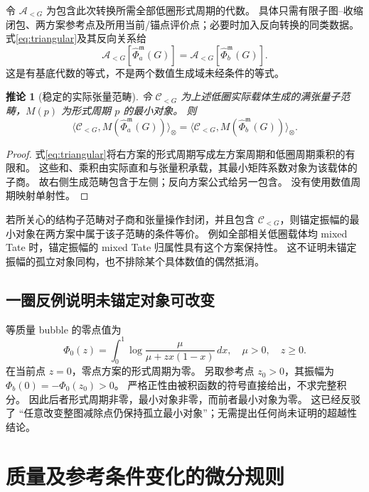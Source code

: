 \documentclass[11pt,a4paper]{ctexart}
\theoremstyle{cnplain}
\newtheorem{corollary}[theorem]{推论}
\theoremstyle{remark}\newtheorem{remark}[theorem]{注}
\newcommand{\cC}{\mathcal C}
\begin{document}
令 $\mathcal A_{<G}$ 为包含此次转换所需全部低圈形式周期的代数。
具体只需有限子图--收缩闭包、两方案参考点及所用当前/锚点评价点；必要时加入反向转换的同类数据。
式\eqref{eq:triangular}及其反向关系给
\begin{equation}\label{eq:algebra}
 \mathcal A_{<G}[\widehat\Phi_a^{\mathfrak m}(G)]
       =\mathcal A_{<G}[\widehat\Phi_b^{\mathfrak m}(G)].
\end{equation}
这是有基底代数的等式，不是两个数值生成域未经条件的等式。

\begin{corollary}[稳定的实际张量范畴]\label{cor:category}
令 $\cC_{<G}$ 为上述低圈实际载体生成的满张量子范畴，$M(p)$ 为形式周期 $p$ 的最小对象。
则
\begin{equation}\label{eq:category}
 \langle\cC_{<G},M(\widehat\Phi_a^{\mathfrak m}(G))\rangle_\otimes
 =\langle\cC_{<G},M(\widehat\Phi_b^{\mathfrak m}(G))\rangle_\otimes.
\end{equation}
\end{corollary}
\begin{proof}
式\eqref{eq:triangular}将右方案的形式周期写成左方案周期和低圈周期乘积的有限和。
这些和、乘积由实际直和与张量积承载，其最小矩阵系数对象为该载体的子商\cite{brown}。
故右侧生成范畴包含于左侧；反向方案公式给另一包含。
没有使用数值周期映射单射性。
\end{proof}

若所关心的结构子范畴对子商和张量操作封闭，并且包含 $\cC_{<G}$，则锚定振幅的最小对象在两方案中属于该子范畴的条件等价。
例如全部相关低圈载体均 mixed Tate 时，锚定振幅的 mixed Tate 归属性具有这个方案保持性。
这不证明未锚定振幅的孤立对象同构，也不排除某个具体数值的偶然抵消。

\subsection{一圈反例说明未锚定对象可改变}
等质量 bubble 的零点值为
\begin{equation}\label{eq:bubble}
 \Phi_0(z)=\int_0^1\log\frac{\mu}{\mu+z x(1-x)}\,dx,
 \quad \mu>0,\quad z\geq0.
\end{equation}
在当前点 $z=0$，零点方案的形式周期为零。
另取参考点 $z_0>0$，其振幅为 $\Phi_b(0)=-\Phi_0(z_0)>0$。
严格正性由被积函数的符号直接给出，不求完整积分。
因此后者形式周期非零，最小对象非零，而前者最小对象为零。
这已经反驳了 ``任意改变整图减除点仍保持孤立最小对象''；无需提出任何尚未证明的超越性结论。

\section{质量及参考条件变化的微分规则}
\end{document}

